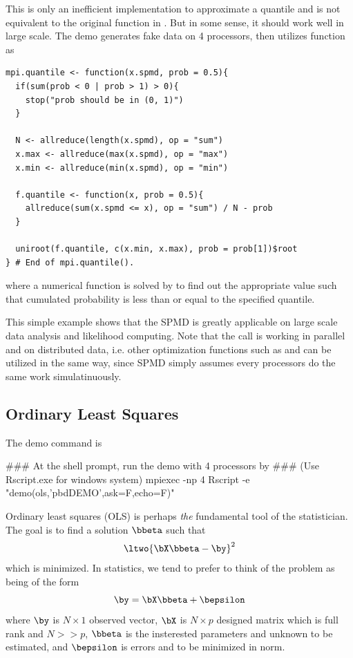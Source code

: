 This is only an inefficient implementation to approximate a quantile
and is not equivalent to the original  function in
. But in some sense, it should work well in large scale.
The demo  generates fake data on 4 processors, then
utilizes  function as
\begin{lstlisting}[language=rr,title=R Code]
mpi.quantile <- function(x.spmd, prob = 0.5){
  if(sum(prob < 0 | prob > 1) > 0){
    stop("prob should be in (0, 1)")
  }

  N <- allreduce(length(x.spmd), op = "sum")
  x.max <- allreduce(max(x.spmd), op = "max")
  x.min <- allreduce(min(x.spmd), op = "min")

  f.quantile <- function(x, prob = 0.5){
    allreduce(sum(x.spmd <= x), op = "sum") / N - prob
  }

  uniroot(f.quantile, c(x.min, x.max), prob = prob[1])$root
} # End of mpi.quantile().
\end{lstlisting}
where a numerical function is solved by  to find out
the appropriate value such that cumulated probability is less than
or equal to the specified quantile.

This simple example shows that the SPMD is greatly applicable on large
scale data analysis and likelihood computing.
Note that the  call is working in parallel and on distributed
data, i.e. other optimization functions such as  and 
can be utilized in the same way,
since SPMD simply assumes every processors do the same work
simulatinuously.




\subsection[Ordinary Least Squares]{Ordinary Least Squares}
\label{sec:ols}

The demo command is
\begin{Command}
### At the shell prompt, run the demo with 4 processors by
### (Use Rscript.exe for windows system)
mpiexec -np 4 Rscript -e "demo(ols,'pbdDEMO',ask=F,echo=F)"
\end{Command}

Ordinary least squares (OLS)
is perhaps \emph{the} fundamental tool of the statistician.  The goal is to find a solution $\bbeta$ such that
\begin{align}
\ltwo{ \bX\bbeta - \by }^2 \label{math:lls}
\end{align}
which is minimized.  In statistics, we tend to prefer to think of the problem as being of the form
$$\by = \bX\bbeta + \bepsilon$$
where $\by$ is $N\times 1$ observed vector,
$\bX$ is $N\times p$ designed matrix which is full rank and $N >> p$,
$\bbeta$ is the insterested parameters and unknown to be estimated,
and $\bepsilon$ is errors and to be minimized in norm.

